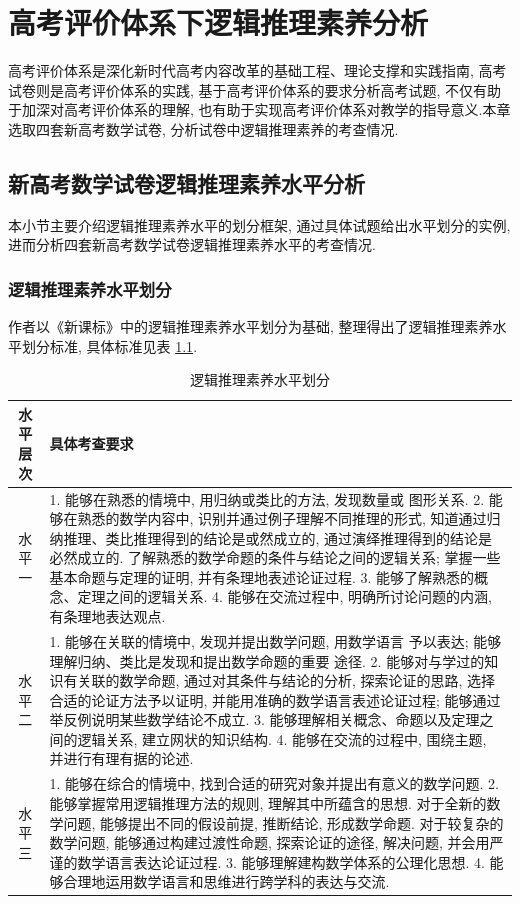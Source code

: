 \documentclass[acaddeg]{Style/SCNUThesisV3}
\begin{document}
\chapter{高考评价体系下逻辑推理素养分析}\label{Cha: 3}
\setcounter{equation}{0}
高考评价体系是深化新时代高考内容改革的基础工程、理论支撑和实践指南, 高考试卷则是高考评价体系的实践, 基于高考评价体系的要求分析高考试题, 不仅有助于加深对高考评价体系的理解, 也有助于实现高考评价体系对教学的指导意义.本章选取四套新高考数学试卷, 分析试卷中逻辑推理素养的考查情况.


\section{新高考数学试卷逻辑推理素养水平分析}
本小节主要介绍逻辑推理素养水平的划分框架, 通过具体试题给出水平划分的实例, 进而分析四套新高考数学试卷逻辑推理素养水平的考查情况.

\subsection{逻辑推理素养水平划分}

作者以《新课标》中的逻辑推理素养水平划分为基础, 整理得出了逻辑推理素养水平划分标准, 具体标准见表  \protect \ref{table:3.1}.

\begin{table}[h]
	\centering
	\caption{逻辑推理素养水平划分}
	\vspace{2mm}
	\begin{tabular}{cp{12cm}}
		\toprule
		\rule{0pt}{20pt}
		水平层次 &具体考查要求  \\
		\midrule
		\rule{0pt}{20pt}
		水平一& 1. 能够在熟悉的情境中, 用归纳或类比的方法, 发现数量或
		图形关系. 2. 能够在熟悉的数学内容中, 识别并通过例子理解不同推理的形式, 知道通过归纳推理、类比推理得到的结论是或然成立的, 通过演绎推理得到的结论是必然成立的. 了解熟悉的数学命题的条件与结论之间的逻辑关系; 掌握一些基本命题与定理的证明, 并有条理地表述论证过程. 3. 能够了解熟悉的概念、定理之间的逻辑关系. 4. 能够在交流过程中, 明确所讨论问题的内涵, 有条理地表达观点. \\
		\rule{0pt}{20pt}
		水平二 & 1. 能够在关联的情境中, 发现并提出数学问题, 用数学语言
		予以表达; 能够理解归纳、类比是发现和提出数学命题的重要
		途径. 2. 能够对与学过的知识有关联的数学命题, 通过对其条件与结论的分析, 探索论证的思路, 选择合适的论证方法予以证明, 并能用准确的数学语言表述论证过程; 能够通过举反例说明某些数学结论不成立. 3. 能够理解相关概念、命题以及定理之间的逻辑关系, 建立网状的知识结构. 4. 能够在交流的过程中, 围绕主题, 并进行有理有据的论述. \\
		\rule{0pt}{20pt}
		水平三&1. 能够在综合的情境中, 找到合适的研究对象并提出有意义的数学问题. 2. 能够掌握常用逻辑推理方法的规则, 理解其中所蕴含的思想. 对于全新的数学问题, 能够提出不同的假设前提, 推断结论, 形成数学命题. 对于较复杂的数学问题, 能够通过构建过渡性命题, 探索论证的途径, 解决问题, 并会用严谨的数学语言表达论证过程. 3. 能够理解建构数学体系的公理化思想. 4. 能够合理地运用数学语言和思维进行跨学科的表达与交流.\\
		\bottomrule
	\end{tabular} 
	\label{table:3.1}
\end{table}
\end{document}
